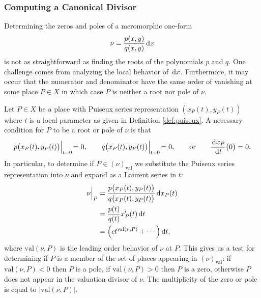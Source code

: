\subsubsection{Computing a Canonical Divisor}\label{sec:canonical}



Determining the zeros and poles of a meromorphic one-form
\begin{equation} \label{eqn:meromorphic-one-form}
\nu = \frac{p(x,y)}{q(x,y)}\,\mathrm{d}x
\end{equation}
is not as straightforward as finding the roots of the polynomials $p$ and $q$.
One challenge comes from analyzing the local behavior of $\,\mathrm{d}x$. Furthermore, it
may occur that the numerator and denominator have the same order of vanishing at
some place $P \in X$ in which case $P$ is neither a root nor pole of $\nu$.

Let $P \in X$ be a place with Puiseux series representation $(x_P(t), y_P(t))$
where $t$ is a local parameter as given in Definition \ref{def:puiseux}. A
necessary condition for $P$ to be a root or pole of $\nu$ is that
\begin{equation}
  p\big(x_P(t), y_P(t)\big) \Big|_{t=0} \! = 0,
  \qquad
  q\big(x_P(t), y_P(t)\big) \Big|_{t=0} \! = 0,
  \qquad \text{or} \qquad
  \frac{\,\mathrm{d}x_P}{\,\mathrm{d}t}\big(0\big) = 0.
\end{equation}
In particular, to determine if $P \in (\nu)_\text{val}$ we substitute the
Puiseux series representation into $\nu$ and expand as a Laurent series in $t$:
\begin{align} \label{eqn:localization}
\nu \Big|_P
&=
\frac{p\big(x_P(t),y_P(t)\big)}{q\big(x_P(t),y_P(t)\big)} \,\mathrm{d}x_P(t) \notag \\
&=
\frac{p(t)}{q(t)} x_P'(t) \,\mathrm{d}t \notag \\
&=
\Big( c t^{\text{val}(\nu,P)} + \cdots \Big) \,\mathrm{d}t,
\end{align}
where $\text{val}(\nu,P)$ is the leading order behavior of $\nu$ at $P$. This
gives us a test for determining if $P$ is a member of the set of places
appearing in $(\nu)_\text{val}$: if $\text{val}(\nu,P) < 0$ then $P$ is a pole,
if $\text{val}(\nu,P) > 0$ then $P$ is a zero, otherwise $P$ does not appear in
the valuation divisor of $\nu$. The multiplicity of the zero or pole is equal to
$|\text{val}(\nu,P)|$.

